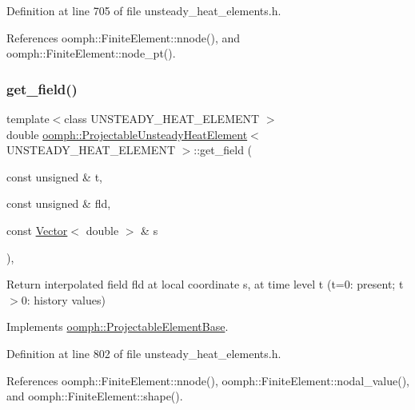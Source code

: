 Definition at line 705 of file unsteady\+\_\+heat\+\_\+elements.\+h.



References oomph\+::\+Finite\+Element\+::nnode(), and oomph\+::\+Finite\+Element\+::node\+\_\+pt().

\mbox{\label{classoomph_1_1ProjectableUnsteadyHeatElement_ae4b0cb13a1849f7e950252164884eeba}} 
\subsubsection{\texorpdfstring{get\+\_\+field()}{get\_field()}}
{\footnotesize\ttfamily template$<$class U\+N\+S\+T\+E\+A\+D\+Y\+\_\+\+H\+E\+A\+T\+\_\+\+E\+L\+E\+M\+E\+NT $>$ \\
double \hyperlink{classoomph_1_1ProjectableUnsteadyHeatElement}{oomph\+::\+Projectable\+Unsteady\+Heat\+Element}$<$ U\+N\+S\+T\+E\+A\+D\+Y\+\_\+\+H\+E\+A\+T\+\_\+\+E\+L\+E\+M\+E\+NT $>$\+::get\+\_\+field (\begin{DoxyParamCaption}\item[{const unsigned \&}]{t,  }\item[{const unsigned \&}]{fld,  }\item[{const \hyperlink{classoomph_1_1Vector}{Vector}$<$ double $>$ \&}]{s }\end{DoxyParamCaption})\hspace{0.3cm}{\ttfamily [inline]}, {\ttfamily [virtual]}}



Return interpolated field fld at local coordinate s, at time level t (t=0\+: present; t$>$0\+: history values) 



Implements \hyperlink{classoomph_1_1ProjectableElementBase_ae4da5b565b6d333be2f5920f7be763cd}{oomph\+::\+Projectable\+Element\+Base}.



Definition at line 802 of file unsteady\+\_\+heat\+\_\+elements.\+h.



References oomph\+::\+Finite\+Element\+::nnode(), oomph\+::\+Finite\+Element\+::nodal\+\_\+value(), and oomph\+::\+Finite\+Element\+::shape().

